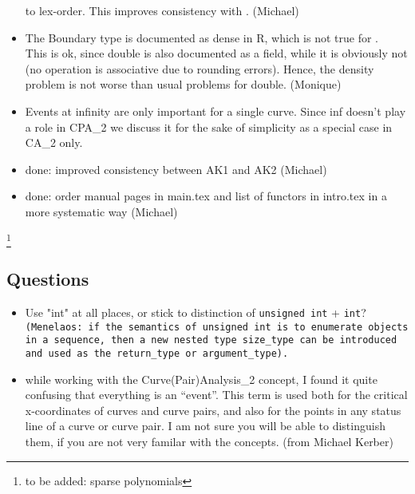 \begin{itemize}
to lex-order. This improves consistency with . 
(Michael)
\item
The Boundary type is documented as dense in R, which is not true
for .\\ 
This is ok, since double is also documented as a
field, while it is obviously not (no operation is associative
due to rounding errors). Hence, the density problem is not worse
than usual problems for double. (Monique)
\item 
Events at infinity are only important for a single curve. Since
inf doesn't play a role in CPA\_2 we discuss it for the sake of
simplicity as a special case in CA\_2 only. 
\item {} done: improved consistency between AK1 and AK2 (Michael)
\item {} done: order manual pages in main.tex and list of functors 
in intro.tex in a more systematic way (Michael)
\end{itemize}
\footnote{to be added: sparse polynomials}

\subsection{Questions}
\begin{itemize}
\item Use "int" at all places, or stick to distinction of \texttt{unsigned
   int} + \texttt{int}?\\
   \texttt{(Menelaos: if the semantics of \texttt{unsigned int} is to enumerate
   objects in a sequence, then a new nested type \texttt{size\_type}
   can be introduced and used as the \texttt{return\_type} or
   \texttt{argument\_type}).}
\item  while working with the Curve(Pair)Analysis\_2 concept,
I found it quite confusing that everything is an ``event''. This term is used
both for the critical x-coordinates of curves and curve pairs, and also
for the points in any status line of a curve or curve pair.
I am not sure you will be able to distinguish them, if you are not very
familar with the concepts.
(from Michael Kerber)
\end{itemize}

